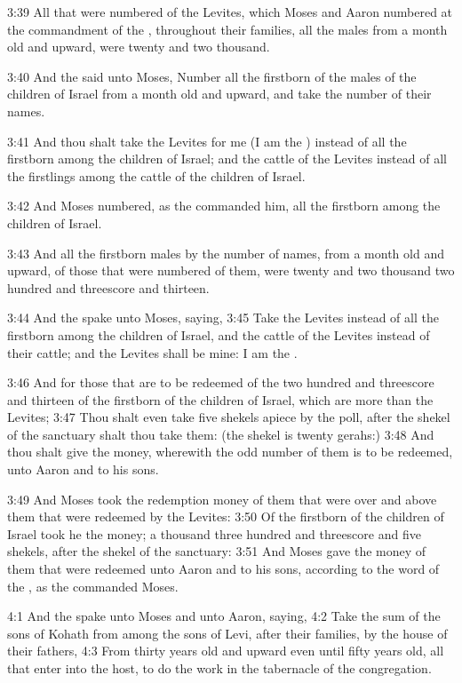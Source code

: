 3:39 All that were numbered of the Levites, which Moses and Aaron
numbered at the commandment of the \LORD, throughout their families,
all the males from a month old and upward, were twenty and two
thousand.

3:40 And the \LORD said unto Moses, Number all the firstborn of the
males of the children of Israel from a month old and upward, and take
the number of their names.

3:41 And thou shalt take the Levites for me (I am the \LORD) instead of
all the firstborn among the children of Israel; and the cattle of the
Levites instead of all the firstlings among the cattle of the children
of Israel.

3:42 And Moses numbered, as the \LORD commanded him, all the firstborn
among the children of Israel.

3:43 And all the firstborn males by the number of names, from a month
old and upward, of those that were numbered of them, were twenty and
two thousand two hundred and threescore and thirteen.

3:44 And the \LORD spake unto Moses, saying, 3:45 Take the Levites
instead of all the firstborn among the children of Israel, and the
cattle of the Levites instead of their cattle; and the Levites shall
be mine: I am the \LORD.

3:46 And for those that are to be redeemed of the two hundred and
threescore and thirteen of the firstborn of the children of Israel,
which are more than the Levites; 3:47 Thou shalt even take five
shekels apiece by the poll, after the shekel of the sanctuary shalt
thou take them: (the shekel is twenty gerahs:) 3:48 And thou shalt
give the money, wherewith the odd number of them is to be redeemed,
unto Aaron and to his sons.

3:49 And Moses took the redemption money of them that were over and
above them that were redeemed by the Levites: 3:50 Of the firstborn of
the children of Israel took he the money; a thousand three hundred and
threescore and five shekels, after the shekel of the sanctuary: 3:51
And Moses gave the money of them that were redeemed unto Aaron and to
his sons, according to the word of the \LORD, as the \LORD commanded
Moses.

4:1 And the \LORD spake unto Moses and unto Aaron, saying, 4:2 Take the
sum of the sons of Kohath from among the sons of Levi, after their
families, by the house of their fathers, 4:3 From thirty years old and
upward even until fifty years old, all that enter into the host, to do
the work in the tabernacle of the congregation.


